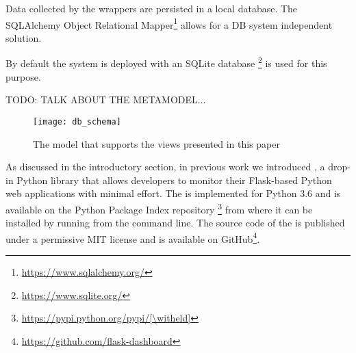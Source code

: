   Data collected by the wrappers are persisted in a local database. The SQLAlchemy Object Relational Mapper\footnote{\url{https://www.sqlalchemy.org/}} allows for a DB system independent solution. 

  By default the system is deployed with an SQLite database \footnote{\url{https://www.sqlite.org/}} is used for this purpose.

TODO: TALK ABOUT THE METAMODEL...


    \begin{figure}[ht!]
      \centering
        \texttt{[image: db\_schema]}
        \caption{The model that supports the views presented in this paper}
        \label{fig:sep}
    \end{figure}

  As discussed in the introductory section, in previous work \withheld we introduced \tool, a drop-in Python library that allows developers to monitor their Flask-based Python web applications with minimal effort.
%
  The \tool is implemented for Python 3.6 and is available on the Python Package Index repository
  \footnote{\url{https://pypi.python.org/pypi/[\witheld]}} 
  from where it can be installed by running \install from the command line. 
%  
  The source code of the \tool is published under a permissive MIT license and is available on GitHub\footnote{\url{https://github.com/flask-dashboard}}.
  
  



